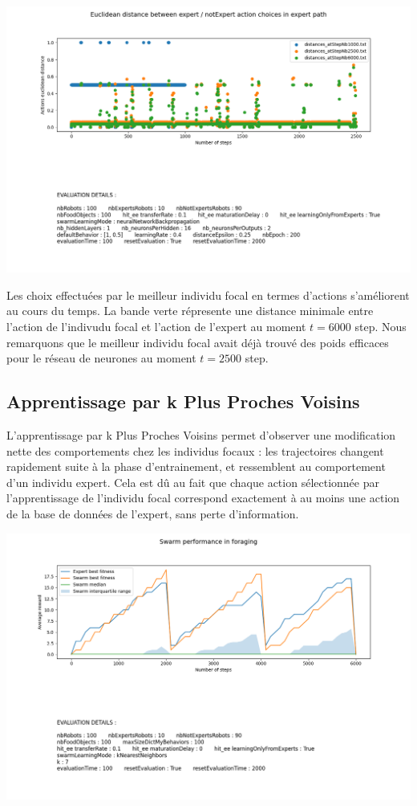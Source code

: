 \documentclass[a4paper, 12pt]{report}
\begin{document}
    \includegraphics[scale=0.5]{Compte_Rendu/images/distances_bp.png}

    Les choix effectuées par le meilleur individu focal en termes d'actions s'améliorent au cours du temps. La bande verte répresente une distance minimale entre l'action de l'indivudu focal et l'action de l'expert au moment $t = 6000$ step.
    Nous remarquons que le meilleur individu focal avait déjà trouvé des poids efficaces pour le réseau de neurones au moment $t = 2500$ step. 





    \subsection{Apprentissage par k Plus Proches Voisins}
    L'apprentissage par k Plus Proches Voisins permet d'observer une modification nette des comportements chez les individus focaux : les trajectoires changent rapidement suite à la phase d'entrainement, et ressemblent au comportement d'un individu expert. Cela est dû au fait que chaque action sélectionnée par l'apprentissage de l'individu focal correspond exactement à au moins une action de la base de données de l'expert, sans perte d'information.
    
    
    \includegraphics[scale=0.5]{Compte_Rendu/images/knn6000_100.png}
    
\end{document}
